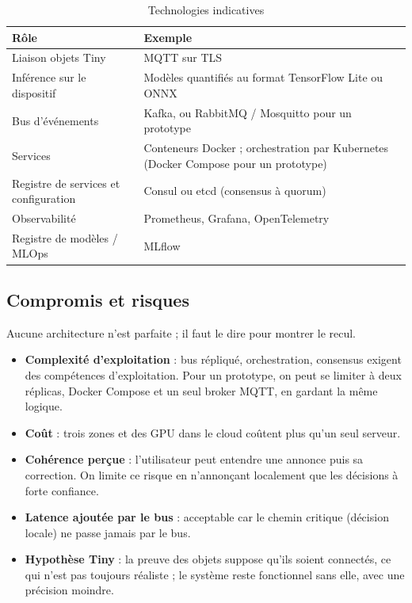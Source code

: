 \documentclass[11pt,a4paper]{article}
\begin{document}
\begin{table}[h]
\centering
\begin{tabular}{|p{4.2cm}|p{10.4cm}|}
\hline
\textbf{Rôle} & \textbf{Exemple} \\
\hline
Liaison objets Tiny & MQTT sur TLS \\
\hline
Inférence sur le dispositif & Modèles quantifiés au format TensorFlow Lite ou ONNX \\
\hline
Bus d'événements & Kafka, ou RabbitMQ / Mosquitto pour un prototype \\
\hline
Services & Conteneurs Docker ; orchestration par Kubernetes (Docker Compose pour un prototype) \\
\hline
Registre de services et configuration & Consul ou etcd (consensus à quorum) \\
\hline
Observabilité & Prometheus, Grafana, OpenTelemetry \\
\hline
Registre de modèles / MLOps & MLflow \\
\hline
\end{tabular}
\caption{Technologies indicatives}
\end{table}

\subsection{Compromis et risques}

Aucune architecture n'est parfaite ; il faut le dire pour montrer le recul.

\begin{itemize}
    \item \textbf{Complexité d'exploitation} : bus répliqué, orchestration, consensus exigent des compétences d'exploitation. Pour un prototype, on peut se limiter à deux réplicas, Docker Compose et un seul broker MQTT, en gardant la même logique.
    \item \textbf{Coût} : trois zones et des GPU dans le cloud coûtent plus qu'un seul serveur.
    \item \textbf{Cohérence perçue} : l'utilisateur peut entendre une annonce puis sa correction. On limite ce risque en n'annonçant localement que les décisions à forte confiance.
    \item \textbf{Latence ajoutée par le bus} : acceptable car le chemin critique (décision locale) ne passe jamais par le bus.
    \item \textbf{Hypothèse Tiny} : la preuve des objets suppose qu'ils soient connectés, ce qui n'est pas toujours réaliste ; le système reste fonctionnel sans elle, avec une précision moindre.
\end{itemize}
\end{document}

